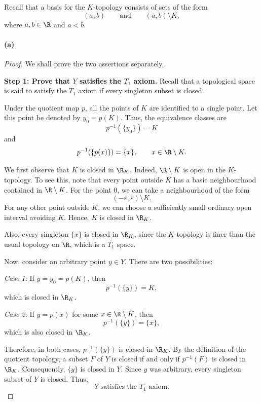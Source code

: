 
Recall that a basis for the $K$-topology consists of sets of the form
\[ (a,b)\qquad\text{and}\qquad (a,b)\setminus K, \]
where $a,b\in\R$ and $a<b$.

\paragraph{(a)}
\begin{proof}
We shall prove the two assertions separately.

\textbf{Step 1: Prove that $Y$ satisfies the $T_1$ axiom.}
Recall that a topological space is said to satisfy the $T_1$ axiom if every singleton subset
is closed.

Under the quotient map $p$, all the points of $K$ are identified to a single point. Let this
point be denoted by $y_0=p(K)$. Thus, the equivalence classes are
\[ p^{-1}(\{y_0\})=K \]
and
\[ p^{-1}(\{p(x)\})=\{x\},\qquad x\in\R\setminus K. \]

We first observe that $K$ is closed in $\R_K$. Indeed, $\R\setminus K$ is open in the
$K$-topology. To see this, note that every point outside $K$ has a basic neighbourhood
contained in $\R\setminus K$. For the point $0$, we can take a neighbourhood of the form
\[ (-\varepsilon,\varepsilon)\setminus K. \]
For any other point outside $K$, we can choose a sufficiently small ordinary open interval
avoiding $K$. Hence, $K$ is closed in $\R_K$.

Also, every singleton $\{x\}$ is closed in $\R_K$, since the $K$-topology is finer than the
usual topology on $\R$, which is a $T_1$ space.

Now, consider an arbitrary point $y\in Y$. There are two possibilities:

\emph{Case 1:} If $y=y_0=p(K)$, then
\[ p^{-1}(\{y\})=K, \]
which is closed in $\R_K$.

\emph{Case 2:} If $y=p(x)$ for some $x\in\R\setminus K$, then
\[ p^{-1}(\{y\})=\{x\}, \]
which is also closed in $\R_K$.

Therefore, in both cases, $p^{-1}(\{y\})$ is closed in $\R_K$. By the definition of the
quotient topology, a subset $F$ of $Y$ is closed if and only if $p^{-1}(F)$ is closed in
$\R_K$. Consequently, $\{y\}$ is closed in $Y$. Since $y$ was arbitrary, every singleton
subset of $Y$ is closed. Thus,
\[ Y \text{ satisfies the } T_1 \text{ axiom.} \]


\end{proof}
